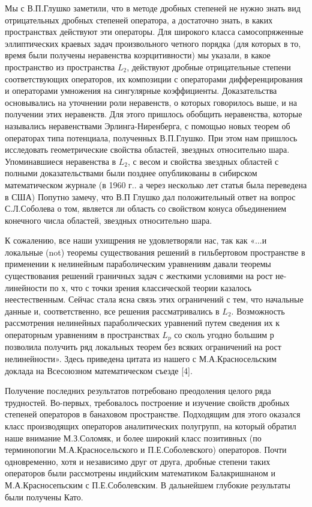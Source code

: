 Мы с В.П.Глушко заметили, что в методе дробных степеней не нужно знать вид отрицательных дробных степеней оператора, а достаточно знать, в каких пространствах действуют эти операторы. Для широкого класса самосопряженные эллиптических краевых задач произвольного четного порядка (для которых в то, время были получены неравенства коэрцитивности) мы указали, в какое пространство из пространства $L_2$, действуют дробные отрицательные степени соответствующих операторов, их композиции с операторами дифференцирования и операторами умножения на сингулярные коэффициенты. Доказательства основывались на уточнении роли неравенств, о которых говорилось выше, и на получении этих неравенств. Для этого пришлось обобщить неравенства, которые назывались неравенствами Эрлинга-Ниренберга, с помощью новых теорем об операторах типа потенциала, полученных В.П.Глушко. При этом нам пришлось исследовать геометрические свойства областей, звездных относительно шара. Упоминавшиеся неравенства в $L_2$, с весом и свойства звездных областей с полными доказательствами были позднее опубликованы в сибирском математическом журнале (в 1960 г.. а через несколько лет статья была переведена в США) Попутно замечу, что В.П Глушко дал положительный ответ на вопрос С.Л.Соболева о том, является ли область со свойством конуса объединением конечного числа областей, звездных относительно шара.

К сожалению, все наши ухищрения не удовлетворяли нас, так как «...и локальные (not) теоремы существования решений в гильбертовом пространстве в применении к нелинейным параболическим уравнениям давали теоремы существования решений граничных задач с жесткими условиями на рост не-линейности по х, что с точки зрения классической теории казалось неестественным. Сейчас стала ясна связь этих ограничений с тем, что начальные данные и, соответственно, все решения рассматривались в $L_2$. Возможность рассмотрения нелинейных параболических уравнений путем сведения их к операторным уравнениям в пространствах $L_p$ со сколь угодно большим $р$ позволила получить ряд локальных теорем без всяких ограничений на рост нелинейности». Здесь приведена цитата из нашего с М.А.Красносельским доклада на Всесоюзном математическом съезде [4].

Получение последних результатов потребовано преодоления целого ряда трудностей. Во-первых, требовалось построение и изучение свойств дробных степеней операторов в банаховом пространстве. Подходящим дпя этого оказался класс производящих операторов аналитических полугрупп, на который обратил наше внимание М.З.Соломяк, и более широкий класс позитивных (по терминопогии М.А.Красносельского и П.Е.Соболевского) операторов. Почти одновременно, хотя и независимо друг от друга, дробные степени таких операторов были рассмотрены индийским математиком Балакришнаном и М.А.Красносепьским с П.Е.Соболевским. В дальнейшем глубокие результаты были получены Като.

